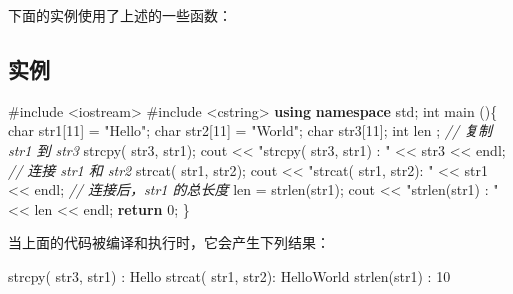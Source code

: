 \documentclass[
]{article}
\newenvironment{Shaded}{}{}
\newcommand{\CommentTok}[1]{\textcolor[rgb]{0.38,0.63,0.69}{\textit{#1}}}
\newcommand{\ControlFlowTok}[1]{\textcolor[rgb]{0.00,0.44,0.13}{\textbf{#1}}}
\newcommand{\DataTypeTok}[1]{\textcolor[rgb]{0.56,0.13,0.00}{#1}}
\newcommand{\DecValTok}[1]{\textcolor[rgb]{0.25,0.63,0.44}{#1}}
\newcommand{\ImportTok}[1]{#1}
\newcommand{\KeywordTok}[1]{\textcolor[rgb]{0.00,0.44,0.13}{\textbf{#1}}}
\newcommand{\NormalTok}[1]{#1}
\newcommand{\OperatorTok}[1]{\textcolor[rgb]{0.40,0.40,0.40}{#1}}
\newcommand{\PreprocessorTok}[1]{\textcolor[rgb]{0.74,0.48,0.00}{#1}}
\newcommand{\StringTok}[1]{\textcolor[rgb]{0.25,0.44,0.63}{#1}}
\begin{document}
下面的实例使用了上述的一些函数：

\hypertarget{ux5b9eux4f8b-13}{%
\subsection{实例}\label{ux5b9eux4f8b-13}}

\begin{Shaded}
\begin{Highlighting}[]
\PreprocessorTok{\#include }\ImportTok{\textless{}iostream\textgreater{}}
\PreprocessorTok{\#include }\ImportTok{\textless{}cstring\textgreater{}}
\KeywordTok{using} \KeywordTok{namespace}\NormalTok{ std}\OperatorTok{;} 
\DataTypeTok{int}\NormalTok{ main }\OperatorTok{()\{}
   \DataTypeTok{char}\NormalTok{ str1}\OperatorTok{[}\DecValTok{11}\OperatorTok{]} \OperatorTok{=} \StringTok{"Hello"}\OperatorTok{;}   
   \DataTypeTok{char}\NormalTok{ str2}\OperatorTok{[}\DecValTok{11}\OperatorTok{]} \OperatorTok{=} \StringTok{"World"}\OperatorTok{;}   
   \DataTypeTok{char}\NormalTok{ str3}\OperatorTok{[}\DecValTok{11}\OperatorTok{];}   
   \DataTypeTok{int}\NormalTok{  len }\OperatorTok{;} 
   \CommentTok{// 复制 str1 到 str3}
\NormalTok{   strcpy}\OperatorTok{(}\NormalTok{ str3}\OperatorTok{,}\NormalTok{ str1}\OperatorTok{);}   
\NormalTok{   cout }\OperatorTok{\textless{}\textless{}} \StringTok{"strcpy( str3, str1) : "} \OperatorTok{\textless{}\textless{}}\NormalTok{ str3 }\OperatorTok{\textless{}\textless{}}\NormalTok{ endl}\OperatorTok{;} 
   \CommentTok{// 连接 str1 和 str2}
\NormalTok{   strcat}\OperatorTok{(}\NormalTok{ str1}\OperatorTok{,}\NormalTok{ str2}\OperatorTok{);}   
\NormalTok{   cout }\OperatorTok{\textless{}\textless{}} \StringTok{"strcat( str1, str2): "} \OperatorTok{\textless{}\textless{}}\NormalTok{ str1 }\OperatorTok{\textless{}\textless{}}\NormalTok{ endl}\OperatorTok{;} 
   \CommentTok{// 连接后，str1 的总长度}
\NormalTok{   len }\OperatorTok{=}\NormalTok{ strlen}\OperatorTok{(}\NormalTok{str1}\OperatorTok{);}   
\NormalTok{   cout }\OperatorTok{\textless{}\textless{}} \StringTok{"strlen(str1) : "} \OperatorTok{\textless{}\textless{}}\NormalTok{ len }\OperatorTok{\textless{}\textless{}}\NormalTok{ endl}\OperatorTok{;} 
   \ControlFlowTok{return} \DecValTok{0}\OperatorTok{;}
\OperatorTok{\}}
\end{Highlighting}
\end{Shaded}

当上面的代码被编译和执行时，它会产生下列结果：

\begin{Shaded}
\begin{Highlighting}[]
\NormalTok{strcpy}\OperatorTok{(}\NormalTok{ str3}\OperatorTok{,}\NormalTok{ str1}\OperatorTok{)} \OperatorTok{:}\NormalTok{ Hello}
\NormalTok{strcat}\OperatorTok{(}\NormalTok{ str1}\OperatorTok{,}\NormalTok{ str2}\OperatorTok{):}\NormalTok{ HelloWorld}
\NormalTok{strlen}\OperatorTok{(}\NormalTok{str1}\OperatorTok{)} \OperatorTok{:} \DecValTok{10}
\end{Highlighting}
\end{Shaded}
\end{document}
